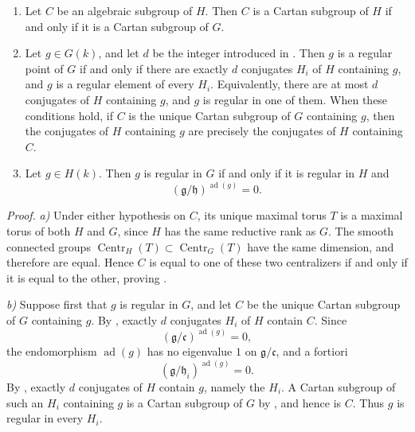 \begin{enumerate}
\item[\textit{a)}] 
  Let \(C\) be an algebraic subgroup of \(H\). Then \(C\) is a
  Cartan subgroup of \(H\) if and only if it is a Cartan subgroup of
  \(G\).

\item[\textit{b)}] 
  Let \(g\in G(k)\), and let \(d\) be the integer introduced in .
  Then \(g\) is a regular point of \(G\) if and only if there are
  exactly \(d\) conjugates \(H_i\) of \(H\) containing \(g\), and
  \(g\) is a regular element of every \(H_i\). Equivalently, there
  are at most \(d\) conjugates of \(H\) containing \(g\), and \(g\)
  is regular in one of them. When these conditions hold, if \(C\) is
  the unique Cartan subgroup of \(G\) containing \(g\), then the
  conjugates of \(H\) containing \(g\) are precisely the conjugates
  of \(H\) containing \(C\).

\item[\textit{c)}] 
  Let \(g\in H(k)\). Then \(g\) is regular in \(G\) if and only if it
  is regular in \(H\) and
  \[
    (\mathfrak g/\mathfrak h)^{\operatorname{ad}(g)}=0.
  \]
\end{enumerate}

\noindent\textit{Proof.}
\textit{a)} Under either hypothesis on \(C\), its unique maximal
torus \(T\) is a maximal torus of both \(H\) and \(G\), since \(H\)
has the same reductive rank as \(G\). The smooth connected groups
\(\operatorname{Centr}_H(T)\subset\operatorname{Centr}_G(T)\) have
the same dimension, and therefore are equal. Hence \(C\) is equal to
one of these two centralizers if and only if it is equal to the
other, proving .

\textit{b)} Suppose first that \(g\) is regular in \(G\), and let
\(C\) be the unique Cartan subgroup of \(G\) containing \(g\). By
, exactly \(d\) conjugates \(H_i\) of \(H\) contain \(C\).
Since
\[
  (\mathfrak g/\mathfrak c)^{\operatorname{ad}(g)}=0,
\]
the endomorphism \(\operatorname{ad}(g)\) has no eigenvalue \(1\) on
\(\mathfrak g/\mathfrak c\), and a fortiori
\[
  (\mathfrak g/\mathfrak h_i)^{\operatorname{ad}(g)}=0.
\]
By , exactly \(d\) conjugates of \(H\) contain \(g\), namely
the \(H_i\). A Cartan subgroup of such an \(H_i\) containing \(g\) is
a Cartan subgroup of \(G\) by , and hence is \(C\). Thus \(g\) is
regular in every \(H_i\).

